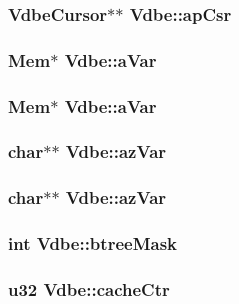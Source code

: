 \subsubsection{\setlength{\rightskip}{0pt plus 5cm}\bf{Vdbe\-Cursor}$\ast$$\ast$ \bf{Vdbe::ap\-Csr}}\label{structVdbe_02848559849d96b3871290686c9617f2}


\subsubsection{\setlength{\rightskip}{0pt plus 5cm}\bf{Mem}$\ast$ \bf{Vdbe::a\-Var}}\label{structVdbe_0b098a5ca2ee6acf8cb06280b8f562bd}


\subsubsection{\setlength{\rightskip}{0pt plus 5cm}\bf{Mem}$\ast$ \bf{Vdbe::a\-Var}}\label{structVdbe_0b098a5ca2ee6acf8cb06280b8f562bd}


\subsubsection{\setlength{\rightskip}{0pt plus 5cm}char$\ast$$\ast$ \bf{Vdbe::az\-Var}}\label{structVdbe_39191fdb8b5761c3260b5b6c4c2988f8}


\subsubsection{\setlength{\rightskip}{0pt plus 5cm}char$\ast$$\ast$ \bf{Vdbe::az\-Var}}\label{structVdbe_39191fdb8b5761c3260b5b6c4c2988f8}


\subsubsection{\setlength{\rightskip}{0pt plus 5cm}int \bf{Vdbe::btree\-Mask}}\label{structVdbe_3e171eb9f8584c339d654a7da247445e}


\subsubsection{\setlength{\rightskip}{0pt plus 5cm}\bf{u32} \bf{Vdbe::cache\-Ctr}}\label{structVdbe_d444f26993df8bafb11f97dad3d9ce12}


